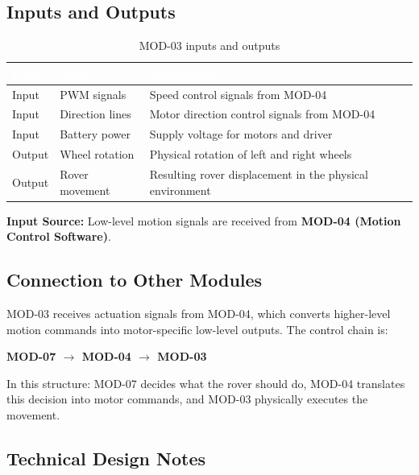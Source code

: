 \documentclass[12pt,a4paper]{article}
\newcommand{\theadtext}[1]{\textcolor{white}{\textbf{#1}}}
\begin{document}
\subsection{Inputs and Outputs}

\begin{table}[H]
\centering\small
\begin{tabularx}{\textwidth}{L{3cm} L{3cm} X}
\toprule
{}
\theadtext{Flow} & \theadtext{Signal} & \theadtext{Description} \\
\midrule
{}   Input  & PWM signals     & Speed control signals from MOD-04 \\
 Input  & Direction lines & Motor direction control signals from MOD-04 \\
   Input  & Battery power   & Supply voltage for motors and driver \\
 Output & Wheel rotation  & Physical rotation of left and right wheels \\
   Output & Rover movement  & Resulting rover displacement in the physical environment \\
\bottomrule
\end{tabularx}
\caption{MOD-03 inputs and outputs}
\end{table}

\textbf{Input Source:} Low-level motion signals are received from \textbf{MOD-04 (Motion Control Software)}.

\subsection{Connection to Other Modules}

MOD-03 receives actuation signals from MOD-04, which converts higher-level motion
commands into motor-specific low-level outputs. The control chain is:

\begin{center}
\textbf{MOD-07 $\rightarrow$ MOD-04 $\rightarrow$ MOD-03}
\end{center}

In this structure: MOD-07 decides what the rover should do, MOD-04 translates this
decision into motor commands, and MOD-03 physically executes the movement.

\subsection{Technical Design Notes}
\end{document}
